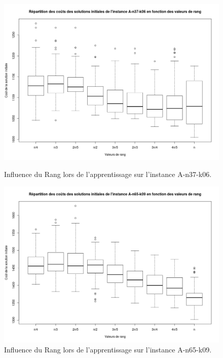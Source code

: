 \documentclass[a4paper,11pt]{article}%
\begin{document}
\begin{figure}[p]


        \centering
        \includegraphics[scale=0.32]{InfluenceRangA3706}
        
        \caption{Influence du Rang lors de l'apprentissage sur l'instance A-n37-k06.}
        \label{InfRA3706}


        \centering
        \includegraphics[scale=0.32]{InfluenceRangA6509}
        
        \caption{Influence du Rang lors de l'apprentissage sur l'instance A-n65-k09.}
        \label{InfRA6509}


\end{figure}
\end{document}
